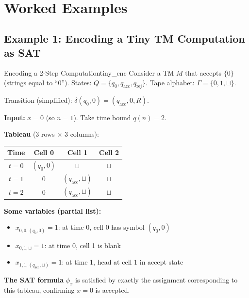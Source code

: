 \documentclass[12pt,a4paper]{article}
\newcommand{\SAT}{\textsc{Sat}}
\newcommand{\leqp}{\leq_p}
\begin{document}
\medskip
\begin{center}
\end{center}

\newpage

\section{Worked Examples}

\subsection{Example 1: Encoding a Tiny TM Computation as SAT}

\begin{example}{Encoding a 2-Step Computation}{tiny_enc}
Consider a TM $M$ that accepts $\{0\}$ (strings equal to ``0'').
States: $Q = \{q_0, q_\text{acc}, q_\text{rej}\}$.
Tape alphabet: $\Gamma = \{0, 1, \sqcup\}$.

\medskip
Transition (simplified): $\delta(q_0, 0) = (q_\text{acc}, 0, R)$.

\medskip
\noindent\textbf{Input:} $x = 0$ (so $n = 1$). Take time bound $q(n) = 2$.

\medskip
\noindent\textbf{Tableau} ($3$ rows $\times$ $3$ columns):
\begin{center}
\begin{tabular}{c|ccc}
\toprule
Time & Cell 0 & Cell 1 & Cell 2 \\
\midrule
$t=0$ & $(q_0, 0)$ & $\sqcup$ & $\sqcup$ \\
$t=1$ & $0$ & $(q_\text{acc}, \sqcup)$ & $\sqcup$ \\
$t=2$ & $0$ & $(q_\text{acc}, \sqcup)$ & $\sqcup$ \\
\bottomrule
\end{tabular}
\end{center}

\medskip
\noindent\textbf{Some variables (partial list):}
\begin{itemize}[leftmargin=2em]
  \item $x_{0,0,(q_0,0)} = 1$: at time 0, cell 0 has symbol $(q_0, 0)$
  \item $x_{0,1,\sqcup} = 1$: at time 0, cell 1 is blank
  \item $x_{1,1,(q_\text{acc},\sqcup)} = 1$: at time 1, head at cell 1 in accept state
\end{itemize}

\medskip
\noindent\textbf{The SAT formula} $\phi_x$ is satisfied by exactly the assignment 
corresponding to this tableau, confirming $x = 0$ is accepted.
\end{example}
\end{document}
